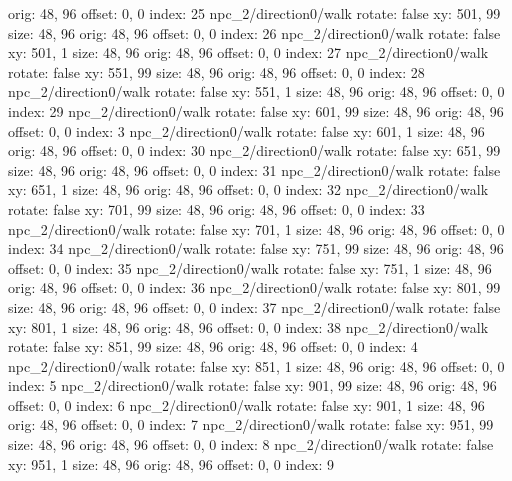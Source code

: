   orig: 48, 96
  offset: 0, 0
  index: 25
npc_2/direction0/walk
  rotate: false
  xy: 501, 99
  size: 48, 96
  orig: 48, 96
  offset: 0, 0
  index: 26
npc_2/direction0/walk
  rotate: false
  xy: 501, 1
  size: 48, 96
  orig: 48, 96
  offset: 0, 0
  index: 27
npc_2/direction0/walk
  rotate: false
  xy: 551, 99
  size: 48, 96
  orig: 48, 96
  offset: 0, 0
  index: 28
npc_2/direction0/walk
  rotate: false
  xy: 551, 1
  size: 48, 96
  orig: 48, 96
  offset: 0, 0
  index: 29
npc_2/direction0/walk
  rotate: false
  xy: 601, 99
  size: 48, 96
  orig: 48, 96
  offset: 0, 0
  index: 3
npc_2/direction0/walk
  rotate: false
  xy: 601, 1
  size: 48, 96
  orig: 48, 96
  offset: 0, 0
  index: 30
npc_2/direction0/walk
  rotate: false
  xy: 651, 99
  size: 48, 96
  orig: 48, 96
  offset: 0, 0
  index: 31
npc_2/direction0/walk
  rotate: false
  xy: 651, 1
  size: 48, 96
  orig: 48, 96
  offset: 0, 0
  index: 32
npc_2/direction0/walk
  rotate: false
  xy: 701, 99
  size: 48, 96
  orig: 48, 96
  offset: 0, 0
  index: 33
npc_2/direction0/walk
  rotate: false
  xy: 701, 1
  size: 48, 96
  orig: 48, 96
  offset: 0, 0
  index: 34
npc_2/direction0/walk
  rotate: false
  xy: 751, 99
  size: 48, 96
  orig: 48, 96
  offset: 0, 0
  index: 35
npc_2/direction0/walk
  rotate: false
  xy: 751, 1
  size: 48, 96
  orig: 48, 96
  offset: 0, 0
  index: 36
npc_2/direction0/walk
  rotate: false
  xy: 801, 99
  size: 48, 96
  orig: 48, 96
  offset: 0, 0
  index: 37
npc_2/direction0/walk
  rotate: false
  xy: 801, 1
  size: 48, 96
  orig: 48, 96
  offset: 0, 0
  index: 38
npc_2/direction0/walk
  rotate: false
  xy: 851, 99
  size: 48, 96
  orig: 48, 96
  offset: 0, 0
  index: 4
npc_2/direction0/walk
  rotate: false
  xy: 851, 1
  size: 48, 96
  orig: 48, 96
  offset: 0, 0
  index: 5
npc_2/direction0/walk
  rotate: false
  xy: 901, 99
  size: 48, 96
  orig: 48, 96
  offset: 0, 0
  index: 6
npc_2/direction0/walk
  rotate: false
  xy: 901, 1
  size: 48, 96
  orig: 48, 96
  offset: 0, 0
  index: 7
npc_2/direction0/walk
  rotate: false
  xy: 951, 99
  size: 48, 96
  orig: 48, 96
  offset: 0, 0
  index: 8
npc_2/direction0/walk
  rotate: false
  xy: 951, 1
  size: 48, 96
  orig: 48, 96
  offset: 0, 0
  index: 9

